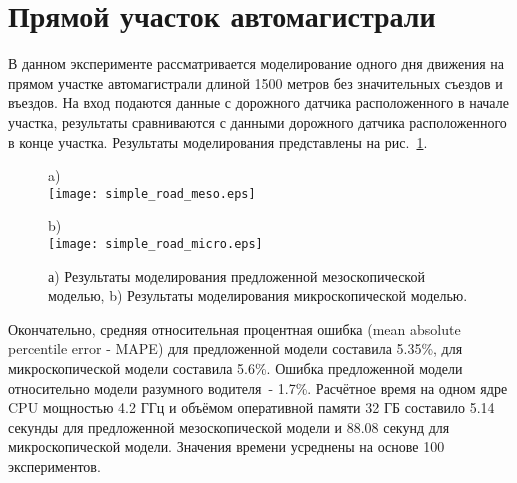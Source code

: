 \section{Прямой участок автомагистрали}
В данном эксперименте рассматривается моделирование одного дня движения на прямом участке автомагистрали длиной 1500 метров без значительных съездов и въездов.
На вход подаются данные с дорожного датчика расположенного в начале участка, результаты сравниваются с данными дорожного датчика расположенного в конце участка.
Результаты моделирования представлены на рис.~\ref{fig:simple_road}.
\begin{figure}[!ht]
\centering
\begin{minipage}[b]{0.49\textwidth}
    \centering
    a)
    \\ \texttt{[image: simple\_road\_meso.eps]}
\end{minipage}
\hfill
\begin{minipage}[b]{0.49\textwidth}
    \centering
    b)
    \\ \texttt{[image: simple\_road\_micro.eps]}
\end{minipage}

\caption{а) Результаты моделирования предложенной мезоскопической моделью, b) Результаты моделирования микроскопической моделью.}
\label{fig:simple_road}
\end{figure}
Окончательно, средняя относительная процентная ошибка (mean absolute percentile error - MAPE) для предложенной модели составила 5.35\%, для микроскопической модели составила 5.6\%.
Ошибка предложенной модели относительно модели разумного водителя~- 1.7\%.
Расчётное время на одном ядре CPU мощностью 4.2 ГГц и объёмом оперативной памяти 32 ГБ составило 5.14 секунды для предложенной мезоскопической модели и 88.08 секунд для микроскопической модели.
Значения времени усреднены на основе 100 экспериментов.

